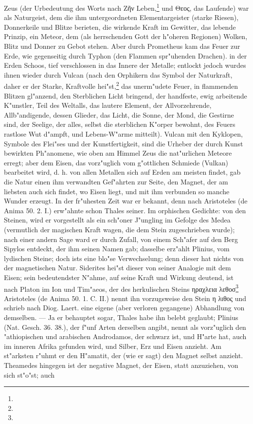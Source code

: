 \documentclass[a4paper, 11pt, oneside, polutonikogreek, german]{article}
\begin{document}
Zeus (der Urbedeutung des Worts nach Ζῆν Leben,\footnote{} und Θεος, das Laufende) war als Naturgeist, dem die ihm untergeordneten Elementargeister (starke Riesen), Donnerkeile und Blitze berieten, die wirkende Kraft im Gewitter, das lebende Prinzip, ein Meteor, dem (als herrschenden Gott der h"oheren Regionen) Wolken, Blitz und Donner zu Gebot stehen. Aber durch Prometheus kam das Feuer zur Erde, wie gegenseitig durch Typhon (den Flammen spr"uhenden Drachen). in der Erden Schoos, tief verschlossen in das Innere der Metalle; entlockt jedoch wurdes ihnen wieder durch Vulcan (nach den Orphikern das Symbol der Naturkraft, daher er der Starke, Kraftvolle hei"st,\footnote{} das unerm"udete Feuer, in flammenden Blitzen gl"anzend, den Sterblichen Licht bringend, der handfeste, ewig arbeitende K"unstler, Teil des Weltalls, das lautere Element, der Allvorzehrende, Allb"andigende, dessen Glieder, das Licht, die Sonne, der Mond, die Gestirne sind, der Seelige, der alles, selbst die sterblichen K"orper bewohnt, des Feuers rastlose Wut d"ampft, und Lebens-W"arme mitteilt). Vulcan mit den Kyklopen, Symbole des Flei"ses und der Kunstfertigkeit, sind die Urheber der durch Kunst bewirkten Ph"anomene, wie oben am Himmel Zeus die nat"urlichen Meteore erregt; aber dem Eisen, das vorz"uglich vom g"ottlichen Schmiede (Vulkan) bearbeitet wird, d. h. von allen Metallen sich auf Erden am meisten findet, gab die Natur einen ihm verwandten Gef"ahrten zur Seite, den Magnet, der am liebsten auch sich findet, wo Eisen liegt, und mit ihm verbunden so manche Wunder erzeugt. In der fr"uhesten Zeit war er bekannt, denn nach Aristoteles (de Anima 50. 2. I.) erw"ahnte schon Thales seiner. Im orphischen Gedichte: von den Steinen, wird er vorgestellt als ein sch"oner J"ungling im Gefolge des Medea (vermutlich der magischen Kraft wagen, die dem Stein zugeschrieben wurde); nach einer andern Sage ward er durch Zufall, von einem Sch"afer auf den Berg Sipylos entdeckt, der ihm seinen Namen gab; dasselbe erz"ahlt Plinius, vom lydischen Steine; doch ists eine blo"se Verwechselung; denn dieser hat nichts von der magnetischen Natur. Siderites hei"st dieser von seiner Analogie mit dem Eisen; sein bedeutendster N"ahme, auf seine Kraft und Wirkung deutend, ist nach Platon im Ion und Tim"aeos, der des herkulischen Steins ηραχλεια λεθοσ\footnote{} Aristoteles (de Anima 50. 1. C. II.) nennt ihn vorzugsweise den Stein η λιθος und schrieb nach Diog. Laert. eine eigene (aber verloren gegangene) Abhandlung von demselben. --- Ja er behauptet sogar, Thales habe ihn belebt geglaubt; Plinius (Nat. Gesch. 36. 38.), der f"unf Arten derselben angibt, nennt als vorz"uglich den "athiopischen und arabischen Androdamos, der schwarz ist, und H"arte hat, auch im inneren Afrika gefunden wird, und Silber, Erz und Eisen anzieht. Am st"arksten r"uhmt er den H"amatit, der (wie er sagt) den Magnet selbst anzieht. Theamedes hingegen ist der negative Magnet, der Eisen, statt anzuziehen, von sich st"o"st; auch 
\end{document}
